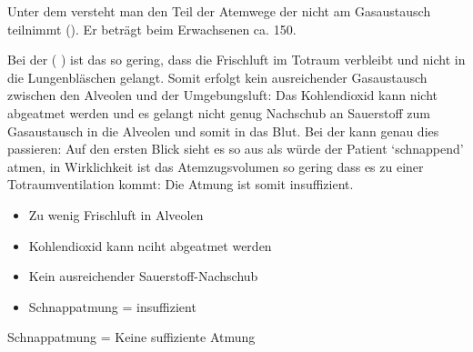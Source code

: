 {%
Unter dem  versteht man den Teil der Atemwege 
der nicht am Gasaustausch teilnimmt (). 
%
Er beträgt beim Erwachsenen ca. 150\Ml*. 
%
\cite{KlinkePhysio3}

Bei der  ( 
)
ist das  so gering, 
dass die Frischluft im Totraum verbleibt 
und nicht in die Lungenbläschen gelangt.
%
Somit erfolgt kein ausreichender Gasaustausch 
zwischen den Alveolen und der Umgebungsluft: 
%
Das Kohlendioxid kann nicht abgeatmet werden 
und es gelangt nicht genug Nachschub an Sauerstoff 
zum Gasaustausch 
in die Alveolen 
und somit in das Blut. 
\label{topic:schnappatmung}
%
Bei der  kann genau dies passieren: 
%
Auf den ersten Blick sieht es so aus 
als würde der Patient \enquote*{schnappend} atmen, 
in Wirklichkeit ist das Atemzugsvolumen so gering 
dass es zu einer Totraumventilation kommt: 
%
Die Atmung ist somit insuffizient.
}{
\begin{itemize}
    \item Zu wenig Frischluft in Alveolen
    \item Kohlendioxid kann nciht abgeatmet werden
    \item Kein ausreichender Sauerstoff-Nachschub
    \item Schnappatmung = insuffizient
\end{itemize}
}{}{}{}


\begin{Danger}
  \item Schnappatmung = Keine suffiziente Atmung
\end{Danger}




